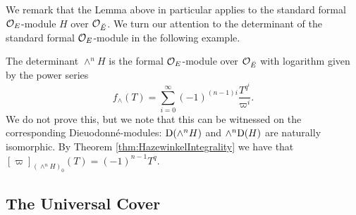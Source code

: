\documentclass[../main.tex]{subfiles}
\begin{document}
We remark that the Lemma above in particular applies to the standard formal 
$\mathcal{O}_E$-module $H$ over $\mathcal{O}_{\breve {E}}$. We turn our attention to the determinant of the standard
formal $\mathcal{O}_E$-module in the following example.

\begin{xpl}
  The determinant $\wedge^n H$ is the formal $\mathcal{O}_E$-module over 
  $\mathcal{O}_{\breve {E}}$ with logarithm given by the power series
  \begin{equation*}
    f_\wedge(T) = \sum_{i=0}^\infty (-1)^{(n-1)i} \frac{T^{q^i}}{\varpi^i}.
  \end{equation*}
  We do not prove this, but we note that this can be witnessed on the
  corresponding Dieuodonn\'e-modules: $\mathrm{D}(\wedge^n H)$ and 
  $\wedge^n \mathrm{D}(H)$ are naturally isomorphic.
  By Theorem \ref{thm:HazewinkelIntegrality} we have that 
  $[\varpi]_{(\wedge^n H)_0}(T) = (-1)^{n-1} T^q$. 
\end{xpl}


\subsection{The Universal Cover} %
\label{sub:Tate Modules and the Universal Cover}
\end{document}
